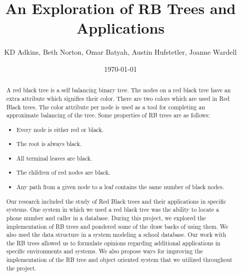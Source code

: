 \documentclass[notitlepage]{report}
\title{An Exploration of RB Trees and Applications}
\author{KD Adkins, Beth Norton, Omar Batyah, Austin Hufstetler, Joanne Wardell}
\date{\today}
\begin{document}
\maketitle
\thispagestyle{empty}

\begin{abstract}
	A red black tree is a self balancing binary tree. The nodes on a red black tree
	have an extra attribute which signifies their color. There are two colors which are
	used in Red Black trees. The color attribute per node is used as a tool for completing 
	an approximate balancing of the tree. Some properties of RB trees are as follows: 
	\begin{itemize}
		\item Every node is either red or black.
		\item The root is always black.
		\item All terminal leaves are black.
		\item The children of red nodes are black.
		\item Any path from a given node to a leaf contains the same number of black nodes.
	\end{itemize}
	Our research included the study of Red Black trees and their applications
	in specific systems. One system in which we used 
	a red black tree was the ability to locate a phone number and caller in a database. 
	During this project, we explored the implementation of RB trees 
	and pondered some of the draw backs of using them. We also used the data structure 
	in a system modeling a school database. Our work with the RB trees allowed us to 
	formulate opinions regarding additional applications in specific environments and systems.
	We also propose ways for improving the implementation of the RB tree and object oriented
	 system that we utilized throughout the project.
\end{abstract}
\end{document}
